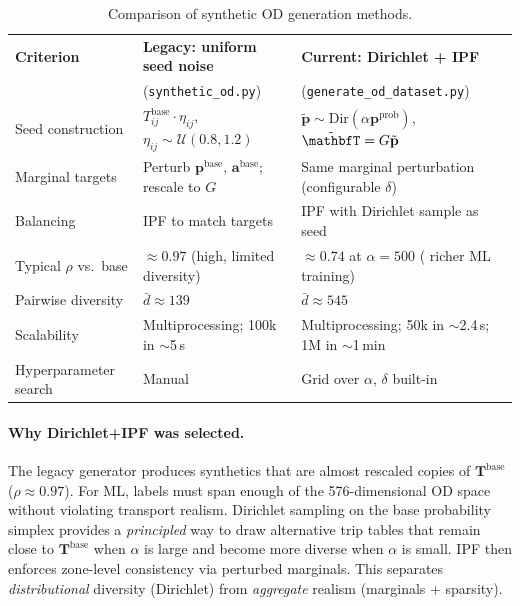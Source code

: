 \documentclass[11pt,a4paper]{report}
\newcommand{\Tbase}{\mathbf{T}^{\mathrm{base}}}
\newcommand{\mathbfp}{\mathbf{p}}
\newcommand{\mathbfa}{\mathbf{a}}
\begin{document}
\begin{table}[ht]
\centering
\caption{Comparison of synthetic OD generation methods.}
\label{tab:gen_compare}
\small
\begin{tabular}{@{}p{3.2cm}p{4.8cm}p{4.8cm}@{}}
\toprule
\textbf{Criterion} & \textbf{Legacy: uniform seed noise} & \textbf{Current: Dirichlet + IPF} \\
 & (\texttt{synthetic\_od.py}) & (\texttt{generate\_od\_dataset.py}) \\
\midrule
Seed construction &
$T^{\mathrm{base}}_{ij}\cdot\eta_{ij}$, $\eta_{ij}\sim\mathcal{U}(0.8,1.2)$ &
$\tilde{\mathbfp}\sim\mathrm{Dir}(\alpha\mathbfp^{\mathrm{prob}})$, $\tilde{\mathbfT}=G\tilde{\mathbfp}$ \\
Marginal targets &
Perturb $\mathbfp^{\mathrm{base}}$, $\mathbfa^{\mathrm{base}}$; rescale to $G$ &
Same marginal perturbation (configurable $\delta$) \\
Balancing &
IPF to match targets &
IPF with Dirichlet sample as seed \\
Typical $\rho$ vs.\ base &
$\approx 0.97$ (high, limited diversity) &
$\approx 0.74$ at $\alpha=500$ ( richer ML training) \\
Pairwise diversity &
$\bar{d}\approx 139$ &
$\bar{d}\approx 545$ \\
Scalability &
Multiprocessing; 100k in $\sim$5\,s &
Multiprocessing; 50k in $\sim$2.4\,s; 1M in $\sim$1\,min \\
Hyperparameter search &
Manual &
Grid over $\alpha$, $\delta$ built-in \\
\bottomrule
\end{tabular}
\end{table}

\paragraph{Why Dirichlet+IPF was selected.}
The legacy generator produces synthetics that are almost rescaled copies of $\Tbase$ ($\rho\approx 0.97$). For ML, labels must span enough of the 576-dimensional OD space without violating transport realism. Dirichlet sampling on the base probability simplex provides a \emph{principled} way to draw alternative trip tables that remain close to $\Tbase$ when $\alpha$ is large and become more diverse when $\alpha$ is small. IPF then enforces zone-level consistency via perturbed marginals. This separates \emph{distributional} diversity (Dirichlet) from \emph{aggregate} realism (marginals + sparsity).
\end{document}
